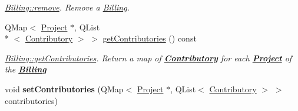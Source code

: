 \begin{DoxyCompactItemize}
\begin{DoxyCompactList}\small\item\em \hyperlink{classBilling_ab5efe0286d292707073b9f1cecd98d6f}{Billing\+::remove}. Remove a \hyperlink{classBilling}{Billing}. \end{DoxyCompactList}\item 
Q\+Map$<$ \hyperlink{classProject}{Project} $\ast$, Q\+List\\*
$<$ \hyperlink{classContributory}{Contributory} $>$ $>$ \hyperlink{classBilling_a04bc7e7fc1e678171892f96ae84f220c}{get\+Contributories} () const 
\begin{DoxyCompactList}\small\item\em \hyperlink{classBilling_a04bc7e7fc1e678171892f96ae84f220c}{Billing\+::get\+Contributories}. Return a map of {\bfseries \hyperlink{classContributory}{Contributory}} for each {\bfseries \hyperlink{classProject}{Project}} of the {\bfseries \hyperlink{classBilling}{Billing}} \end{DoxyCompactList}\item 
\hypertarget{classBilling_acf648437150f745808ed74fd2590806a}{void {\bfseries set\+Contributories} (Q\+Map$<$ \hyperlink{classProject}{Project} $\ast$, Q\+List$<$ \hyperlink{classContributory}{Contributory} $>$ $>$ contributories)}\label{classBilling_acf648437150f745808ed74fd2590806a}


\end{DoxyCompactItemize}
